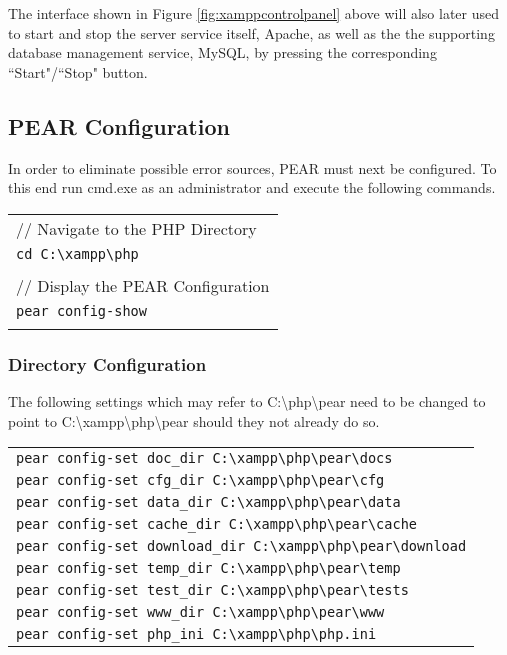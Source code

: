 \noindent
The interface shown in Figure \ref{fig:xamppcontrolpanel} above will also later used to start and stop the server service itself, Apache, as well as the the supporting database management service, MySQL, by pressing the corresponding ``Start"/``Stop" button.

\subsection{PEAR Configuration}

In order to eliminate possible error sources, PEAR must next be configured. To this end run cmd.exe as an administrator and execute the following commands.\\

\begin{tabular}{l}
	// Navigate to the PHP Directory\\
	\texttt{cd C:\textbackslash xampp\textbackslash php}\\
	\\
	// Display the PEAR Configuration\\
	\texttt{pear config-show} \\
	\\
\end{tabular} 

\subsubsection{Directory Configuration}

The following settings which may refer to C:\textbackslash php\textbackslash pear need to be changed to point to C:\textbackslash xampp\textbackslash php\textbackslash pear should they not already do so.\\

\begin{tabular}{l}
	\texttt{pear config-set doc\_dir C:\textbackslash xampp\textbackslash php\textbackslash pear\textbackslash docs} \\
	\texttt{pear config-set cfg\_dir C:\textbackslash xampp\textbackslash php\textbackslash pear\textbackslash cfg} \\
	\texttt{pear config-set data\_dir C:\textbackslash xampp\textbackslash php\textbackslash pear\textbackslash data} \\
	\texttt{pear config-set cache\_dir C:\textbackslash xampp\textbackslash php\textbackslash pear\textbackslash cache} \\
	\texttt{pear config-set download\_dir C:\textbackslash xampp\textbackslash php\textbackslash pear\textbackslash download} \\
	\texttt{pear config-set temp\_dir C:\textbackslash xampp\textbackslash php\textbackslash pear\textbackslash temp} \\
	\texttt{pear config-set test\_dir C:\textbackslash xampp\textbackslash php\textbackslash pear\textbackslash tests} \\
	\texttt{pear config-set www\_dir C:\textbackslash xampp\textbackslash php\textbackslash pear\textbackslash www} \\
	\texttt{pear config-set php\_ini C:\textbackslash xampp\textbackslash php\textbackslash php.ini}
\end{tabular}

